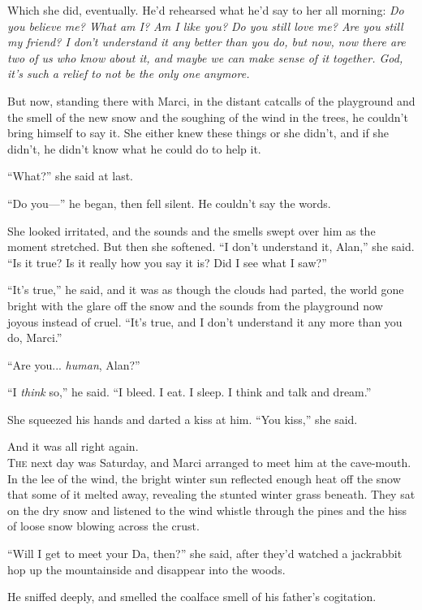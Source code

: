 Which she did, eventually.  He'd rehearsed what he'd say to her all
morning:  \textit{Do you believe me?  What am I?  Am I like you?  Do
you still love me?  Are you still my friend?  I don't understand it
any better than you do, but now, now there are two of us who know
about it, and maybe we can make sense of it together.  God, it's such
a relief to not be the only one anymore.}

But now, standing there with Marci, in the distant catcalls of the
playground and the smell of the new snow and the soughing of the wind
in the trees, he couldn't bring himself to say it.  She either knew
these things or she didn't, and if she didn't, he didn't know what he
could do to help it.

``What?'' she said at last.

``Do you---'' he began, then fell silent.  He couldn't say the words.

She looked irritated, and the sounds and the smells swept over him as
the moment stretched.  But then she softened.  ``I don't understand
it, Alan,'' she said.  ``Is it true?  Is it really how you say it is? 
Did I see what I saw?''

``It's true,'' he said, and it was as though the clouds had parted,
the world gone bright with the glare off the snow and the sounds from
the playground now joyous instead of cruel.  ``It's true, and I don't
understand it any more than you do, Marci.''

``Are you...  \textit{human}, Alan?''

``I \textit{think} so,'' he said.  ``I bleed.  I eat.  I sleep.  I
think and talk and dream.''

She squeezed his hands and darted a kiss at him.  ``You kiss,'' she
said.

And it was all right again.
\\
\lettrine[lines=3, lhang=.5, nindent=0pt, findent=2pt]{T}{he} next day was Saturday, and Marci arranged to meet him at the
cave-mouth.  In the lee of the wind, the bright winter sun reflected
enough heat off the snow that some of it melted away, revealing the
stunted winter grass beneath.  They sat on the dry snow and listened
to the wind whistle through the pines and the hiss of loose snow
blowing across the crust.

``Will I get to meet your Da, then?'' she said, after they'd watched a
jackrabbit hop up the mountainside and disappear into the woods.

He sniffed deeply, and smelled the coalface smell of his father's
cogitation.

